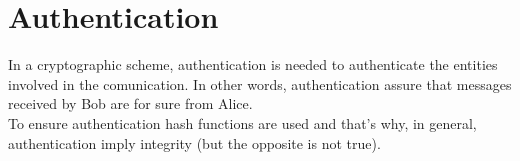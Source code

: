 \section{Authentication}
In a cryptographic scheme, authentication is needed to authenticate the entities involved in the comunication. In other words, authentication assure that messages received by Bob are for sure from Alice.\\
To ensure authentication hash functions are used and that's why, in general, authentication imply integrity (but the opposite is not true).


